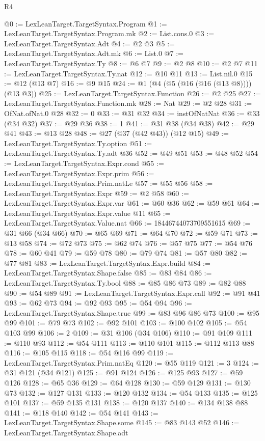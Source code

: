 \begin{lexlean}{R4}
\begin{coremodule}
@0 := LexLeanTarget.TargetSyntax.Program
@1 := LexLeanTarget.TargetSyntax.Program.mk
@2 := List.cons.{0}
@3 := LexLeanTarget.TargetSyntax.Adt
@4 := @2 @3
@5 := LexLeanTarget.TargetSyntax.Adt.mk
@6 := List.{0}
@7 := LexLeanTarget.TargetSyntax.Ty
@8 := @6 @7
@9 := @2 @8
@10 := @2 @7
@11 := LexLeanTarget.TargetSyntax.Ty.nat
@12 := @10 @11
@13 := List.nil.{0}
@15 := @12 (@13 @7)
@16 := @9 @15
@24 := @1 (@4 (@5 (@16 (@16 (@13 @8)))) (@13 @3))
@25 := LexLeanTarget.TargetSyntax.Function
@26 := @2 @25
@27 := LexLeanTarget.TargetSyntax.Function.mk
@28 := Nat
@29 := @2 @28
@31 := OfNat.ofNat.{0} @28
@32 := 0
@33 := @31 @32
@34 := instOfNatNat
@36 := @33 (@34 @32)
@37 := @29 @36
@38 := 1
@41 := @31 @38 (@34 @38)
@42 := @29 @41
@43 := @13 @28
@48 := @27 (@37 (@42 @43)) (@12 @15)
@49 := LexLeanTarget.TargetSyntax.Ty.option
@51 := LexLeanTarget.TargetSyntax.Ty.adt @36
@52 := @49 @51
@53 := @48 @52
@54 := LexLeanTarget.TargetSyntax.Expr.cond
@55 := LexLeanTarget.TargetSyntax.Expr.prim
@56 := LexLeanTarget.TargetSyntax.Prim.natLe
@57 := @55 @56
@58 := LexLeanTarget.TargetSyntax.Expr
@59 := @2 @58
@60 := LexLeanTarget.TargetSyntax.Expr.var
@61 := @60 @36
@62 := @59 @61
@64 := LexLeanTarget.TargetSyntax.Expr.value @11
@65 := LexLeanTarget.TargetSyntax.Value.nat
@66 := 18446744073709551615
@69 := @31 @66 (@34 @66)
@70 := @65 @69
@71 := @64 @70
@72 := @59 @71
@73 := @13 @58
@74 := @72 @73
@75 := @62 @74
@76 := @57 @75
@77 := @54 @76
@78 := @60 @41
@79 := @59 @78
@80 := @79 @74
@81 := @57 @80
@82 := @77 @81
@83 := LexLeanTarget.TargetSyntax.Expr.build
@84 := LexLeanTarget.TargetSyntax.Shape.false
@85 := @83 @84
@86 := LexLeanTarget.TargetSyntax.Ty.bool
@88 := @85 @86 @73
@89 := @82 @88
@90 := @54 @89
@91 := LexLeanTarget.TargetSyntax.Expr.call
@92 := @91 @41
@93 := @62 @73
@94 := @92 @93
@95 := @54 @94
@96 := LexLeanTarget.TargetSyntax.Shape.true
@99 := @83 @96 @86 @73
@100 := @95 @99
@101 := @79 @73
@102 := @92 @101
@103 := @100 @102
@105 := @54 @103 @99
@106 := 2
@109 := @31 @106 (@34 @106)
@110 := @91 @109
@111 := @110 @93
@112 := @54 @111
@113 := @110 @101
@115 := @112 @113 @88
@116 := @105 @115
@118 := @54 @116 @99
@119 := LexLeanTarget.TargetSyntax.Prim.natEq
@120 := @55 @119
@121 := 3
@124 := @31 @121 (@34 @121)
@125 := @91 @124
@126 := @125 @93
@127 := @59 @126
@128 := @65 @36
@129 := @64 @128
@130 := @59 @129
@131 := @130 @73
@132 := @127 @131
@133 := @120 @132
@134 := @54 @133
@135 := @125 @101
@137 := @59 @135 @131
@138 := @120 @137
@140 := @134 @138 @88
@141 := @118 @140
@142 := @54 @141
@143 := LexLeanTarget.TargetSyntax.Shape.some
@145 := @83 @143 @52
@146 := LexLeanTarget.TargetSyntax.Shape.adt

\end{coremodule}
\end{lexlean}
